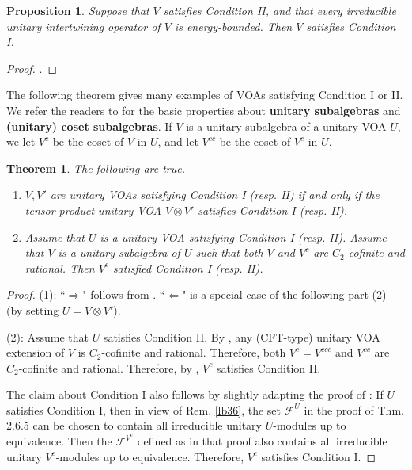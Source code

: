 \documentclass[11pt,b5paper,notitlepage]{article}
\theoremstyle{definition}
\theoremstyle{plain}
\newtheorem{thm}[df]{Theorem}
\newtheorem{pp}[df]{Proposition}
\newcommand{\mc}{\mathcal}
\numberwithin{equation}{section}
\begin{document}
\begin{pp}\label{lb79}
Suppose that $V$ satisfies Condition II, and that every irreducible unitary intertwining operator of $V$ is energy-bounded. Then $V$ satisfies Condition I.
\end{pp}

\begin{proof}
\cite[Cor. 2.5.11]{Gui20}.
\end{proof}




The following theorem gives many examples of VOAs satisfying Condition I or II. We refer the readers to \cite[Sec. 5.4]{CKLW18} for the basic properties about \textbf{unitary subalgebras} and \textbf{(unitary) coset subalgebras}. If $V$ is a unitary subalgebra of a unitary VOA $U$, we let $V^c$ be the coset of $V$ in $U$, and let $V^{cc}$ be the coset of $V^c$ in $U$.

\begin{thm}\label{lb102}
The following are true.
\begin{enumerate}[label=(\arabic*)]
\item $V,V'$ are unitary VOAs satisfying Condition I (resp. II) if and only if the tensor product unitary VOA $V\otimes V'$ satisfies Condition I (resp. II).
\item Assume that $U$ is a unitary VOA satisfying Condition I (resp. II). Assume that $V$ is a unitary subalgebra of $U$ such that both $V$ and $V^c$ are $C_2$-cofinite and rational. Then $V^c$ satisfied Condition I (resp. II).
\end{enumerate}
\end{thm}

\begin{proof}
(1): ``$\Rightarrow$" follows from \cite[Thm. 2.6.8]{Gui20}. ``$\Leftarrow$" is a special case of the following part (2) (by setting $U=V\otimes V'$).

(2): Assume that $U$ satisfies Condition II. By \cite[Thm. 1.1]{CMSY24}, any (CFT-type) unitary VOA extension of $V$ is $C_2$-cofinite and rational. Therefore, both $V^c=V^{ccc}$ and $V^{cc}$ are $C_2$-cofinite and rational. Therefore, by \cite[Thm. 2.6.5]{Gui20}, $V^c$ satisfies  Condition II.

The claim about Condition I also follows by slightly adapting the proof of \cite[Thm. 2.6.5]{Gui20}: If $U$ satisfies Condition I, then in view of Rem. \ref{lb36}, the set $\mc F^U$ in the proof of Thm. 2.6.5  can be chosen to contain all irreducible unitary $U$-modules up to equivalence. Then the $\mc F^{V^c}$ defined as in that proof also contains all irreducible unitary $V^c$-modules up to equivalence. Therefore, $V^c$ satisfies Condition I.
\end{proof}
\end{document}
